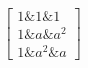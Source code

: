 \documentclass[preview]{standalone}
\begin{document}
\begin{align*}
\begin{bmatrix} 1 \& 1 \& 1 \\ 1 \& a \& a^2 \\ 1 \& a^2 \& a \end{bmatrix}
\end{align*}
\end{document}
